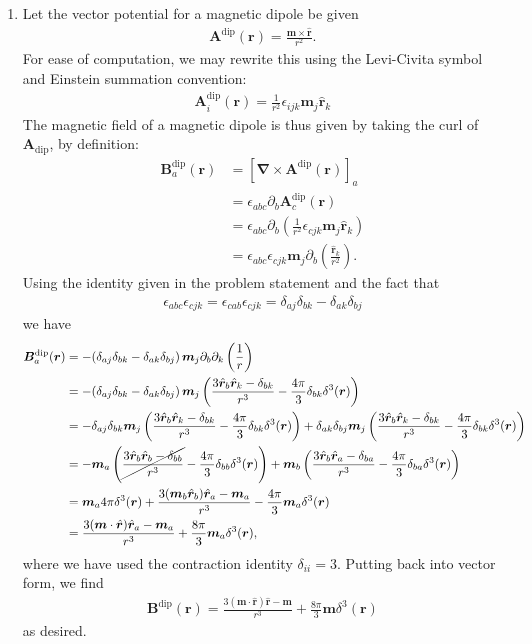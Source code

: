 \documentclass{article}
\theoremstyle{definition}
\newcommand{\p}{\partial}
\newcommand{\f}[2]{\frac{#1}{#2}}
\newcommand{\lp}{\left(}
\newcommand{\rp}{\right)}
\begin{document}
\begin{enumerate}[label=(\alph*)]
	
	\item Let the vector potential for a magnetic dipole be given 
	\begin{align*}
	\bm{A}^\text{dip}(\bm{r}) = \f{\bm{m} \times \hat{\bm{r}}}{r^2}.
	\end{align*}
	For ease of computation, we may rewrite this using the Levi-Civita symbol and Einstein summation convention:
	\begin{align*}
	\bm{A}^\text{dip}_i(\bm{r}) = \f{1}{r^2}\epsilon_{ijk} \bm{m}_j \hat{\bm{r}}_k 
	\end{align*}
	The magnetic field of a magnetic dipole is thus given by taking the curl of $\bm{A}_\text{dip}$, by definition:
	\begin{align*}
	\bm{B}^\text{dip}_a(\bm{r}) 
	&= [\bm{\nabla}\times \bm{A}^\text{dip}(\bm{r})]_a \\
	&= \epsilon_{abc} \p_b \bm{A}^\text{dip}_c(\bm{r})\\
	&= \epsilon_{abc} \p_b \lp \f{1}{r^2}\epsilon_{cjk} \bm{m}_j \hat{\bm{r}}_k  \rp\\
	&= \epsilon_{abc}\epsilon_{cjk} \bm{m}_j \p_b \lp \f{\hat{\bm{r}}_k}{r^2}  \rp.
	\end{align*}
	Using the identity given in the problem statement and the fact that
	\begin{align*}
	\epsilon_{abc}\epsilon_{cjk} = \epsilon_{cab}\epsilon_{cjk} = \delta_{aj}\delta_{bk} - \delta_{ak}\delta_{bj}
	\end{align*}
	we have
	\begin{align*}
	\bm{B}^\text{dip}_a(\bm{r}) &= -(\delta_{aj}\delta_{bk} - \delta_{ak}\delta_{bj})\, \bm{m}_j \p_b \p_k  \lp \f{1}{r}  \rp\\
	&= -(\delta_{aj}\delta_{bk} - \delta_{ak}\delta_{bj})\, \bm{m}_j \lp \f{3 \hat{\bm{r}}_b \hat{\bm{r}}_k - \delta_{bk}}{r^3} - \f{4\pi}{3} \delta_{bk} \delta^3(\bm{r})  \rp\\
	&= -\delta_{aj}\delta_{bk} \bm{m}_j \lp \f{3 \hat{\bm{r}}_b \hat{\bm{r}}_k - \delta_{bk}}{r^3} - \f{4\pi}{3} \delta_{bk} \delta^3(\bm{r})  \rp + \delta_{ak}\delta_{bj}\bm{m}_j \lp \f{3 \hat{\bm{r}}_b \hat{\bm{r}}_k - \delta_{bk}}{r^3} - \f{4\pi}{3} \delta_{bk} \delta^3(\bm{r})  \rp\\
	&= -\bm{m}_a \lp \cancel{\f{3 \hat{\bm{r}}_b \hat{\bm{r}}_b - \delta_{bb}}{r^3}} - \f{4\pi}{3} \delta_{bb} \delta^3(\bm{r})  \rp + \bm{m}_b \lp \f{3 \hat{\bm{r}}_b \hat{\bm{r}}_a - \delta_{ba}}{r^3} - \f{4\pi}{3} \delta_{ba} \delta^3(\bm{r})  \rp \\
	&= \bm{m}_a 4\pi \delta^3(\bm{r})    +   \f{3 (\bm{m}_b\hat{\bm{r}}_b) \hat{\bm{r}}_a - \bm{m}_a}{r^3} - \f{4\pi}{3} \bm{m}_a \delta^3(\bm{r})   \\
	&=   \f{3 (\bm{m}\cdot \hat{\bm{r}}) \hat{\bm{r}}_a - \bm{m}_a}{r^3} + \f{8\pi}{3} \bm{m}_a \delta^3(\bm{r}),
	\end{align*}
	where we have used the contraction identity $\delta_{ii}=3$.  Putting back into vector form, we find 
	\begin{align*}
	\bm{B}^\text{dip}(\bm{r}) =  \f{3 (\bm{m}\cdot \hat{\bm{r}}) \hat{\bm{r}} - \bm{m}}{r^3} + \f{8\pi}{3} \bm{m} \delta^3(\bm{r})
	\end{align*}
	as desired. 
	

\end{enumerate}
\end{document}
